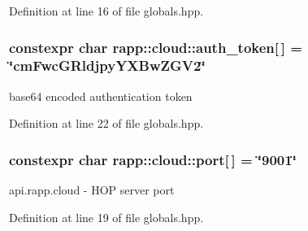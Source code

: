 Definition at line 16 of file globals.\-hpp.

\hypertarget{namespacerapp_1_1cloud_aff8eeba44e8c84efe3401443fb83699a}{
\subsubsection[{auth\-\_\-token}]{\setlength{\rightskip}{0pt plus 5cm}constexpr char rapp\-::cloud\-::auth\-\_\-token\mbox{[}$\,$\mbox{]} = \char`\"{}cm\-Fwc\-G\-Rldjpy\-Y\-X\-Bw\-Z\-G\-V2\char`\"{}}}\label{namespacerapp_1_1cloud_aff8eeba44e8c84efe3401443fb83699a}


base64 encoded authentication token 



Definition at line 22 of file globals.\-hpp.

\hypertarget{namespacerapp_1_1cloud_ae0e4cb6fd54bbf45234fc3c21f752b7a}{
\subsubsection[{port}]{\setlength{\rightskip}{0pt plus 5cm}constexpr char rapp\-::cloud\-::port\mbox{[}$\,$\mbox{]} = \char`\"{}9001\char`\"{}}}\label{namespacerapp_1_1cloud_ae0e4cb6fd54bbf45234fc3c21f752b7a}


api.\-rapp.\-cloud -\/ H\-O\-P server port 



Definition at line 19 of file globals.\-hpp.

